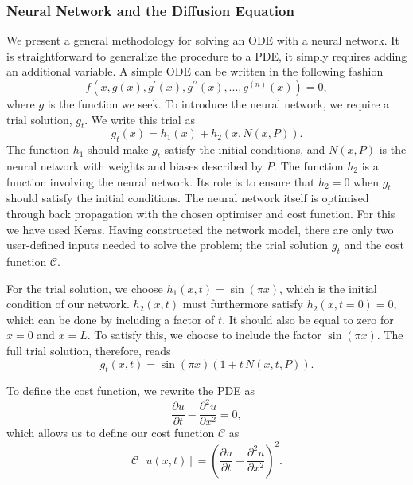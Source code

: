 \documentclass[a4paper, 
amsfonts, 
amssymb, 
amsmath, 
reprint, 
showkeys, 
nofootinbib, 
twoside]{revtex4-2}
\begin{document}
\subsubsection{Neural Network and the Diffusion Equation}
We present a general methodology for solving an ODE with a neural network. It is straightforward to generalize the procedure to a PDE, it simply requires adding an additional variable. 
A simple ODE can be written in the following fashion
\begin{equation}
    f(x, g(x), g^{\prime} (x), g^{\prime \prime} (x), ... , g^{(n)} (x) ) = 0,
\end{equation}
where $g$ is the function we seek. To introduce the neural network, we require a trial solution, $g_t$. We write this trial as
\begin{equation*}
    g_t(x) = h_1(x) + h_2(x, N(x, P)).
\end{equation*}
The function $h_1$ should make $g_t$ satisfy the initial conditions, and $N(x, P)$ is the neural network with weights and biases described by $P$. The function $h_2$ is a function involving the neural network. Its role is to ensure that $h_2 = 0$ when $g_t$ should satisfy the initial conditions. The neural network itself is optimised through back propagation with the chosen optimiser and cost function. For this we have used Keras\cite{keras}. Having constructed the network model, there are only two user-defined inputs needed to solve the problem; the trial solution $g_t$ and the cost function $\mathcal{C}$.

For the trial solution, we choose $h_1(x, t) = \sin{(\pi x)}$, which is the initial condition of our network. $h_2(x, t)$ must furthermore satisfy $h_2(x, t = 0) = 0$, which can be done by including a factor of $t$. It should also be equal to zero for $x = 0$ and $x = L$. To satisfy this, we choose to include the factor $\sin(\pi x)$. The full trial solution, therefore, reads
\begin{equation*}
    g_t(x, t) = \sin(\pi x) (1 + t\, N(x, t, P)).
\end{equation*}

To define the cost function, we rewrite the PDE as
\begin{equation}
    \frac{\partial u}{\partial t} - \frac{\partial^2u}{\partial x^2} = 0,
\end{equation}
which allows us to define our cost function $\mathcal{C}$ as
\begin{equation}
    \mathcal{C}[u(x,t)] = \left( \frac{\partial u}{\partial t} - \frac{\partial^2u}{\partial x^2} \right)^2.
\end{equation}
\end{document}
